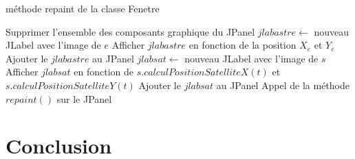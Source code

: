 \documentclass[a4paper,10pt]{article}
\begin{document}
\begin{algorithm}
\caption{méthode repaint de la classe Fenetre}
\begin{algorithmic}
\State Supprimer l'ensemble des composants graphique du JPanel
    \State $jlabastre\gets$ nouveau JLabel avec l'image de $e$
    \State Afficher $jlabastre$ en fonction de la position $X_{e}$ et $Y_{e}$
    \State Ajouter le $jlabastre$ au JPanel
	\State $jlabsat\gets$ nouveau JLabel avec l'image de $s$
	\State Afficher $jlabsat$ en fonction de $s.calculPositionSatelliteX(t)$ et $s.calculPositionSatelliteY(t)$
	\State Ajouter le $jlabsat$ au JPanel
    \EndFor
\EndFor
\State Appel de la méthode $repaint()$ sur le JPanel
\EndFunction
\end{algorithmic}
\end{algorithm}


\section{Conclusion}
\end{document}
